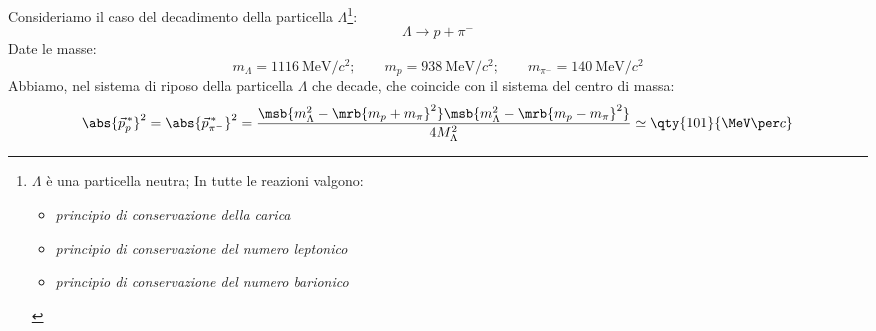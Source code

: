\begin{example}[]
  Consideriamo il caso del decadimento della particella $\Lambda$\footnote{
    $\Lambda$ è una particella neutra; In tutte le reazioni valgono:
    \begin{itemize}
      \item \textit{principio di conservazione della carica}
      \item \textit{principio di conservazione del numero leptonico}
      \item \textit{principio di conservazione del numero barionico}
    \end{itemize}
  }:
	\begin{equation}
		\Lambda \rightarrow p + \pi ^{-}
	\end{equation}
  Date le masse:
  \begin{equation}
    m _{\Lambda} = \qty{1116}{\MeV \per c^2};
    \qquad
    m_p = \qty{938}{\MeV \per c^2};
    \qquad
    m _{\pi^-} = \qty{140}{\MeV \per c^2}
  \end{equation}
	Abbiamo, nel sistema di riposo della particella $\Lambda$ che decade, che
  coincide con il sistema del centro di massa:
	\begin{equation}
		\abs{\vec{p}_{p}^{\,\ast}}^{2}
		= \abs{\vec{p}_{\pi^-}^{\,\ast}}^{2}
		= \frac{
			\msb{m _{\Lambda} ^{2} - \mrb{m _{p} + m _{\pi}}^{2}}
			\msb{m _{\Lambda} ^{2} - \mrb{m _{p} - m _{\pi}}^{2}}
		}{4 M _{\Lambda}^{2}}
    \simeq \qty{101}{\MeV \per c}
	\end{equation}
\end{example}
